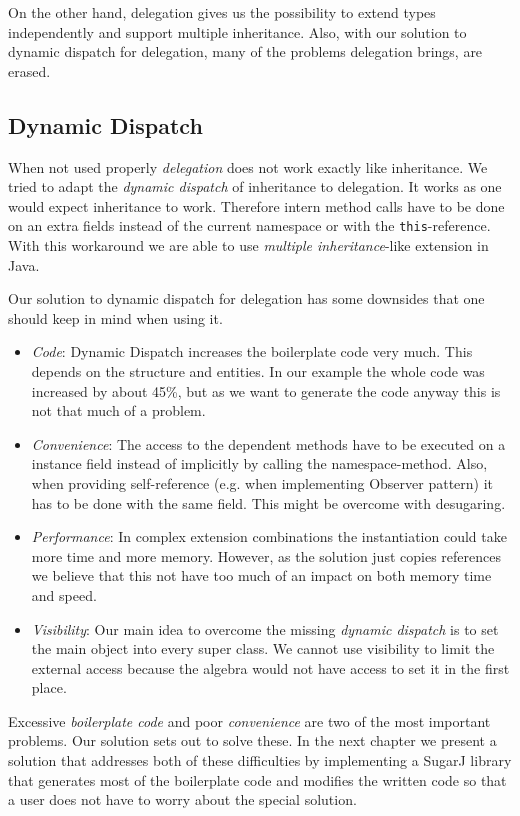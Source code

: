 \documentclass{report}
\begin{document}
On the other hand, delegation gives us the possibility to extend types independently and support multiple inheritance. Also, with our solution to dynamic dispatch for delegation, many of the problems delegation brings, are erased.

\subsection{Dynamic Dispatch}
\label{discussionDynamicDispatch}

When not used properly \emph{delegation} does not work exactly like inheritance. We tried to adapt the \emph{dynamic dispatch} of inheritance to delegation. It works as one would expect inheritance to work. Therefore intern method calls have to be done on an extra fields instead of the current namespace or with the \lstinline{this}-reference. With this workaround we are able to use \emph{multiple inheritance}-like extension in Java.

Our solution to dynamic dispatch for delegation has some downsides that one should keep in mind when using it.
\begin{itemize}
  \item \emph{Code}: Dynamic Dispatch increases the boilerplate code very much. This depends on the structure and entities. In our example the whole code was increased by about 45\%, but as we want to generate the code anyway this is not that much of a problem.
  \item \emph{Convenience}: The access to the dependent methods have to be executed on a instance field instead of implicitly by calling the namespace-method. Also, when providing self-reference (e.g. when implementing Observer pattern\cite{Gof-Design-1993}) it has to be done with the same field. This might be overcome with desugaring.
  \item \emph{Performance}: In complex extension combinations the instantiation could take more time and more memory. However, as the solution just copies references we believe that this not have too much of an impact on both memory time and speed.
  \item \emph{Visibility}: Our main idea to overcome the missing \emph{dynamic dispatch} is to set the main object into every super class. We cannot use visibility to limit the external access because the algebra would not have access to set it in the first place.
\end{itemize}

Excessive \emph{boilerplate code} and poor \emph{convenience} are two of the most important problems. Our solution sets out to solve these. In the next chapter we present a solution that addresses both of these difficulties by implementing a SugarJ library that generates most of the boilerplate code and modifies the written code so that a user does not have to worry about the special solution.
\end{document}
